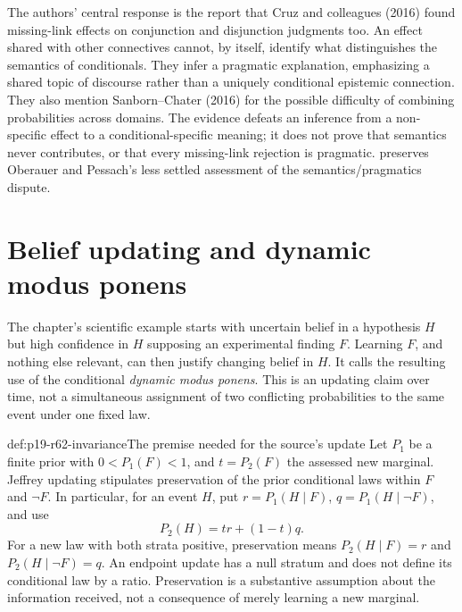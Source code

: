 The authors' central response is the report that Cruz and colleagues (2016)
found missing-link effects on conjunction and disjunction judgments too.
An effect shared with other connectives cannot, by itself, identify what
distinguishes the semantics of conditionals. They infer a pragmatic
explanation, emphasizing a shared topic of discourse rather than a uniquely
conditional epistemic connection. They also mention Sanborn--Chater (2016)
for the possible difficulty of combining probabilities across domains.
The evidence defeats an inference from a non-specific effect to a
conditional-specific meaning; it does not prove that semantics never
contributes, or that every missing-link rejection is pragmatic.
 preserves Oberauer and Pessach's less
settled assessment of the semantics/pragmatics dispute.

\section{Belief updating and dynamic modus ponens}
\label{sec:p19-r62-updating}

The chapter's scientific example starts with uncertain belief in a
hypothesis \(H\) but high confidence in \(H\) supposing an experimental
finding \(F\). Learning \(F\), and nothing else relevant, can then
justify changing belief in \(H\). It calls the resulting use of the
conditional \emph{dynamic modus ponens}. This is an updating claim over
time, not a simultaneous assignment of two conflicting probabilities to
the same event under one fixed law.

\begin{hbdefinition}{def:p19-r62-invariance}{The premise needed for the source's update}
Let \(P_1\) be a finite prior with \(0<P_1(F)<1\), and
\(t=P_2(F)\) the assessed new marginal. Jeffrey updating stipulates
preservation of the prior conditional laws within \(F\) and
\(\neg F\). In particular, for an event \(H\), put
\(r=P_1(H\mid F)\), \(q=P_1(H\mid\neg F)\), and use
\[
 P_2(H)=tr+(1-t)q.
\]
For a new law with both strata positive, preservation means
\(P_2(H\mid F)=r\) and \(P_2(H\mid\neg F)=q\).
An endpoint update has a null stratum and does not define its conditional
law by a ratio. Preservation is a substantive assumption about the
information received, not a consequence of merely learning a new marginal.
\end{hbdefinition}

